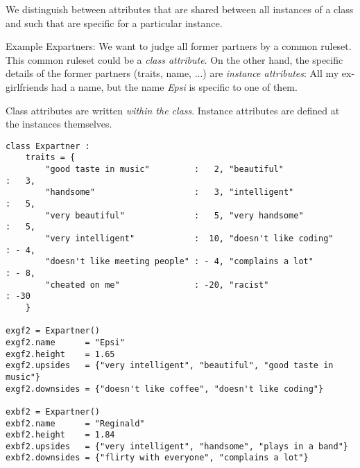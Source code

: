 \begin{frame}
%
\begin{hintbox}
We distinguish between attributes that are shared between all instances of a class and such that are specific for a particular instance.

Example Expartners: We want to judge all former partners by a common ruleset. This common ruleset could be a \emph{class attribute}.
On the other hand, the specific details of the former partners (traits, name, ...) are \emph{instance attributes}: All my ex-girlfriends had a name, but the name \emph{Epsi} is specific to one of them.

Class attributes are written \emph{within the class}. Instance attributes are defined at the instances themselves.
\end{hintbox}
%
\end{frame}


\begin{frame}[fragile]
%
\begin{codebox}
\begin{verbatim}
class Expartner :
    traits = {
        "good taste in music"         :   2, "beautiful"                   :   3,
        "handsome"                    :   3, "intelligent"                 :   5,
        "very beautiful"              :   5, "very handsome"               :   5,
        "very intelligent"            :  10, "doesn't like coding"         : - 4,
        "doesn't like meeting people" : - 4, "complains a lot"             : - 8,
        "cheated on me"               : -20, "racist"                      : -30
    }

exgf2 = Expartner()
exgf2.name      = "Epsi"
exgf2.height    = 1.65
exgf2.upsides   = {"very intelligent", "beautiful", "good taste in music"}
exgf2.downsides = {"doesn't like coffee", "doesn't like coding"}

exbf2 = Expartner()
exbf2.name      = "Reginald"
exbf2.height    = 1.84
exbf2.upsides   = {"very intelligent", "handsome", "plays in a band"}
exbf2.downsides = {"flirty with everyone", "complains a lot"}
\end{verbatim}
\end{codebox}
%
\end{frame}


